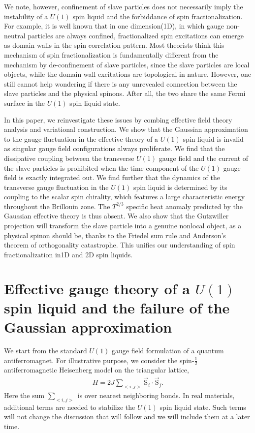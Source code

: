 \documentclass[12pt]{article}
\begin{document}
We note, however, confinement of slave particles does not necessarily imply the instability of a $U(1)$ spin liquid and the forbiddance of spin fractionalization. For example, it is well known that in one dimension(1D), in which gauge non-neutral particles are always confined, fractionalized spin excitations can emerge as domain walls in the spin correlation pattern. Most theorists think this mechanism of spin fractionalization is fundamentally different from the mechanism by de-confinement of slave particles, since the slave particles are local objects, while the domain wall excitations are topological in nature\cite{Fradkin1,Fradkin2,Nayak}. However, one still cannot help wondering if there is any unrevealed connection between the slave particles and the physical spinons. After all, the two share the same Fermi surface in the $U(1)$ spin liquid state.

In this paper, we reinvestigate these issues by combing effective field theory analysis and variational construction. We show that the Gaussian approximation to the gauge fluctuation in the effective theory of a $U(1)$ spin liquid is invalid as singular gauge field configurations always proliferate. We find that the dissipative coupling between the transverse $U(1)$ gauge field and the current of the slave particles is prohibited when the time component of the $U(1)$ gauge field is exactly integrated out. We find further that the dynamics of the transverse gauge fluctuation in the $U(1)$ spin liquid is determined by its coupling to the scalar spin chirality, which features a large characteristic energy throughout the Brillouin zone. The $T^{2/3}$ specific heat anomaly predicted by the Gaussian effective theory is thus absent. We also show that the Gutzwiller projection will transform the slave particle into a genuine nonlocal object, as a physical spinon should be, thanks to the Friedel sum rule and Anderson's theorem of orthogonality catastrophe. This unifies our understanding of spin fractionalization in1D and 2D spin liquids.

\section*{Effective gauge theory of a $U(1)$ spin liquid and the failure of the Gaussian approximation}
We start from the standard $U(1)$ gauge field formulation of a quantum antiferromagnet. For illustrative purpose, we consider the spin-$\frac{1}{2}$ antiferromagnetic Heisenberg model on the triangular lattice, 
\begin{eqnarray}
H=2J\sum_{<i,j>} \vec{\mathrm{S}}_{i}\cdot\vec{\mathrm{S}}_{j}.\nonumber
\end{eqnarray} 
Here the sum $\sum_{<i,j>}$ is over nearest neighboring bonds. In real materials, additional terms are needed to stabilize the $U(1)$ spin liquid state. Such terms will not change the discussion that will follow and we will include them at a later time.
 
\end{document}
